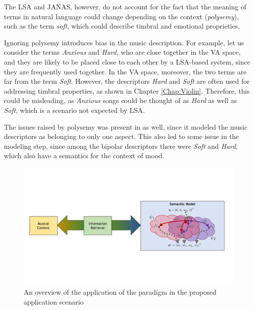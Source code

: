 The LSA and JANAS, however, do not account for the fact that the meaning of terms in natural language could change depending on the context (\textit{polysemy}), such as the term \textit{soft}, which could describe timbral and emotional proprieties.

Ignoring polysemy introduces bias in the music description. For example, let us consider the terms \textit{Anxious} and \textit{Hard}, who are close together in the VA space, and they are likely to be placed close to each other by a LSA-based system, since they are frequently used together. In the VA space, moreover, the two terms are far from the term \textit{Soft}. However, the descriptors \textit{Hard} and \textit{Soft} are often used for addressing timbral properties, as shown in Chapter \ref{Chap:Violin}. Therefore, this could be misleading, as \textit{Anxious} songs could be thought of as \textit{Hard} as well as \textit{Soft}, which is a scenario not expected by LSA. 

The issues raised by polysemy was present in \cite{Buccoli2013} as well, since it modeled the music descriptors as belonging to only one aspect. This also led to some issue in the modeling step, since among the bipolar descriptors there were \textit{Soft} and \textit{Hard}, which also have a semantics for the context of mood.


 \begin{figure}[tbp]
    \begin{center}
      \includegraphics[trim=0.8cm 5.6cm 0.8cm 5.2cm,clip=true,width=\textwidth]{img/DCSM/musical}
    \end{center}
  \caption{An overview of the application of the paradigm in the proposed application scenario}
  \label{fig:DCSM:scheme}
  \end{figure}



